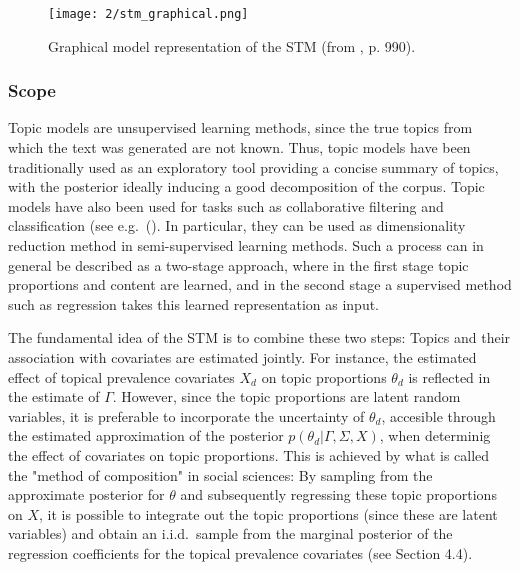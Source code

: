 \documentclass[12pt]{article}
\begin{document}
\begin{figure}[h!]
  \centering
  \captionsetup{justification=centering,margin=2cm}
  \texttt{[image: 2/stm\_graphical.png]}
  \caption{Graphical model representation of the STM (from \cite{roberts2016model}, p. 990).}
  \label{fig:graphical_model}
\end{figure}

\subsubsection*{Scope}

Topic models are unsupervised learning methods, since the true topics from which the text was generated are not known. Thus, topic models have been traditionally used as an exploratory tool providing a concise summary of topics, with the posterior ideally inducing a good decomposition of the corpus. Topic models have also been used for tasks such as collaborative filtering and classification (see e.g.\ (\citealp{blei2003latent}). In particular, they can be used as dimensionality reduction method in semi-supervised learning methods. Such a process can in general be described as a two-stage approach, where in the first stage topic proportions and content are learned, and in the second stage a supervised method such as regression takes this learned representation as input. 

The fundamental idea of the STM is to combine these two steps: Topics and their association with covariates are estimated jointly. For instance, the estimated effect of topical prevalence covariates $X_d$ on topic proportions $\theta_d$ is reflected in the estimate of $\Gamma$. However, since the topic proportions are latent random variables, it is preferable to incorporate the uncertainty of $\theta_d$, accesible through the estimated approximation of the posterior $p(\theta_d | \Gamma, \Sigma, X)$, when determinig the effect of covariates on topic proportions. This is achieved by what is called the "method of composition" in social sciences: By sampling from the approximate posterior for $\theta$ and subsequently regressing these topic proportions on $X$, it is possible to integrate out the topic proportions (since these are latent variables) and obtain an i.i.d.\ sample from the marginal posterior of the regression coefficients for the topical prevalence covariates (see Section 4.4).
\end{document}
